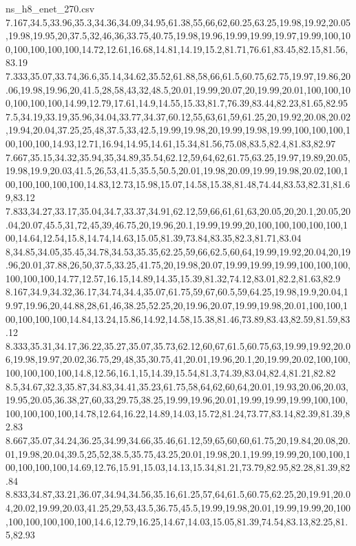 \begin{filecontents*}[overwrite]{ns_h8_enet_270.csv}
7.167,34.5,33.96,35.3,34.36,34.09,34.95,61.38,55,66,62,60.25,63.25,19.98,19.92,20.05,19.98,19.95,20,37.5,32,46,36,33.75,40.75,19.98,19.96,19.99,19.99,19.97,19.99,100,100,100,100,100,100,14.72,12.61,16.68,14.81,14.19,15.2,81.71,76.61,83.45,82.15,81.56,83.19
7.333,35.07,33.74,36.6,35.14,34.62,35.52,61.88,58,66,61.5,60.75,62.75,19.97,19.86,20.06,19.98,19.96,20,41.5,28,58,43,32,48.5,20.01,19.99,20.07,20,19.99,20.01,100,100,100,100,100,100,14.99,12.79,17.61,14.9,14.55,15.33,81.7,76.39,83.44,82.23,81.65,82.95
7.5,34.19,33.19,35.96,34.04,33.77,34.37,60.12,55,63,61,59,61.25,20,19.92,20.08,20.02,19.94,20.04,37.25,25,48,37.5,33,42.5,19.99,19.98,20,19.99,19.98,19.99,100,100,100,100,100,100,14.93,12.71,16.94,14.95,14.61,15.34,81.56,75.08,83.5,82.4,81.83,82.97
7.667,35.15,34.32,35.94,35,34.89,35.54,62.12,59,64,62,61.75,63.25,19.97,19.89,20.05,19.98,19.9,20.03,41.5,26,53,41.5,35.5,50.5,20.01,19.98,20.09,19.99,19.98,20.02,100,100,100,100,100,100,14.83,12.73,15.98,15.07,14.58,15.38,81.48,74.44,83.53,82.31,81.69,83.12
7.833,34.27,33.17,35.04,34.7,33.37,34.91,62.12,59,66,61,61,63,20.05,20,20.1,20.05,20.04,20.07,45.5,31,72,45,39,46.75,20,19.96,20.1,19.99,19.99,20,100,100,100,100,100,100,14.64,12.54,15.8,14.74,14.63,15.05,81.39,73.84,83.35,82.3,81.71,83.04
8,34.85,34.05,35.45,34.78,34.53,35.35,62.25,59,66,62.5,60,64,19.99,19.92,20.04,20,19.96,20.01,37.88,26,50,37.5,33.25,41.75,20,19.98,20.07,19.99,19.99,19.99,100,100,100,100,100,100,14.77,12.57,16.15,14.89,14.35,15.39,81.32,74.12,83.01,82.2,81.63,82.9
8.167,34.9,34.32,36.17,34.74,34.4,35.07,61.75,59,67,60.5,59,64.25,19.98,19.9,20.04,19.97,19.96,20,44.88,28,61,46,38.25,52.25,20,19.96,20.07,19.99,19.98,20.01,100,100,100,100,100,100,14.84,13.24,15.86,14.92,14.58,15.38,81.46,73.89,83.43,82.59,81.59,83.12
8.333,35.31,34.17,36.22,35.27,35.07,35.73,62.12,60,67,61.5,60.75,63,19.99,19.92,20.06,19.98,19.97,20.02,36.75,29,48,35,30.75,41,20.01,19.96,20.1,20,19.99,20.02,100,100,100,100,100,100,14.8,12.56,16.1,15,14.39,15.54,81.3,74.39,83.04,82.4,81.21,82.82
8.5,34.67,32.3,35.87,34.83,34.41,35.23,61.75,58,64,62,60,64,20.01,19.93,20.06,20.03,19.95,20.05,36.38,27,60,33,29.75,38.25,19.99,19.96,20.01,19.99,19.99,19.99,100,100,100,100,100,100,14.78,12.64,16.22,14.89,14.03,15.72,81.24,73.77,83.14,82.39,81.39,82.83
8.667,35.07,34.24,36.25,34.99,34.66,35.46,61.12,59,65,60,60,61.75,20,19.84,20.08,20.01,19.98,20.04,39.5,25,52,38.5,35.75,43.25,20.01,19.98,20.1,19.99,19.99,20,100,100,100,100,100,100,14.69,12.76,15.91,15.03,14.13,15.34,81.21,73.79,82.95,82.28,81.39,82.84
8.833,34.87,33.21,36.07,34.94,34.56,35.16,61.25,57,64,61.5,60.75,62.25,20,19.91,20.04,20.02,19.99,20.03,41.25,29,53,43.5,36.75,45.5,19.99,19.98,20.01,19.99,19.99,20,100,100,100,100,100,100,14.6,12.79,16.25,14.67,14.03,15.05,81.39,74.54,83.13,82.25,81.5,82.93

\end{filecontents*}

